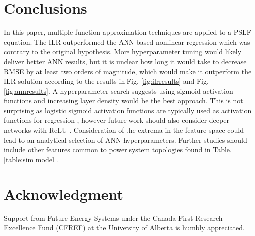 \documentclass[conference]{IEEEtran}
\begin{document}
\section{Conclusions}
\label{sec:conc}
In this paper, multiple function approximation techniques are applied to a PSLF equation. The ILR outperformed the ANN-based nonlinear regression which was contrary to the original hypothesis. More hyperparameter tuning would likely deliver better ANN results, but it is unclear how long it would take to decrease RMSE by at least two orders of magnitude, which would make it outperform the ILR solution according to the results in Fig. \ref{fig:ilrresults} and Fig. \ref{fig:annresults}. A hyperparameter search suggests using sigmoid activation functions and increasing layer density would be the best approach. This is not surprising as logistic sigmoid activation functions are typically used as activation functions for regression \cite{hou2016}\cite{arul2003}, however future work should also consider deeper networks with ReLU \cite{hieb2017}. Consideration of the extrema in the feature space could lead to an analytical selection of ANN hyperparameters. Further studies should include other features common to power system topologies found in Table. \ref{table:sim model}.

\section*{Acknowledgment}
Support from Future Energy Systems under the Canada First Research Excellence Fund (CFREF) at the University of Alberta is humbly appreciated.




\end{document}
